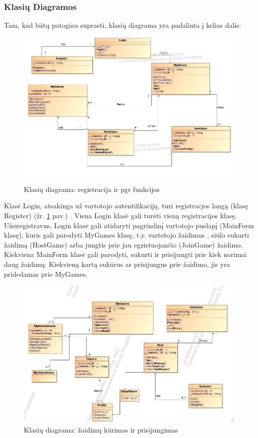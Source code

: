 \documentclass{VUMIFPSkursinis}
\begin{document}
	\subsubsection{Klasių Diagramos}
			Tam, kad būtų patogiau suprasti, klasių diagrama yra padalinta į kelias dalis:
			\begin{figure}[H]
				\centering
				\includegraphics[scale=0.5]{img/BoardGamesClassDiagram}
				\caption{Klasių diagrama: registracija ir pgr funkcijos}
				\label{img:BoardGamesClassDiagram}
			\end{figure}
			Klasė Login, atsakinga už vartotojo autentifikaciją, turi  registracjos langą (klasę Register) (žr. \ref{img:BoardGamesClassDiagram} pav.) . Viena Login klasė gali turėti vieną   registracijos klasę. Užsiregistravus, Login klasė gali atidaryti pagrindinį vartotojo puslapį (MainForm klasę), kuris gali parodyti MyGames klasę, t.y. vartotojo žaidimus , siūlo sukurti žaidimą (HostGame) arba jungtis prie jau egzistuojančio (JoinGame) žaidimo. Kiekviena MainForm klasė gali parodyti, sukurti ir prisijungti prie kiek norimai daug žaidimų. Kiekvieną kartą sukūrus ar prisijungus prie žaidimo, jis yra pridedamas prie MyGames. 
			\begin{figure}[H]
				\centering
				\includegraphics[scale=0.5]{img/BoardGamesClassDiagrampt1}
				\caption{Klasių diagrama: žaidimų kūrimas ir prisijungimas}
				\label{img:BoardGamesClassDiagrampt1}
			\end{figure}
\end{document}
